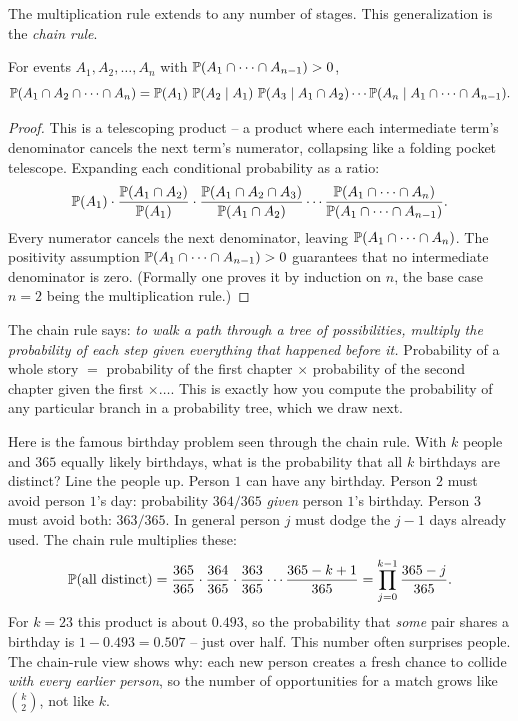 The multiplication rule extends to any number of stages. This generalization is the \emph{chain rule}.

\begin{theorem}
\label{ch04:chain-rule}
For events $A_1, A_2, \dots, A_n$ with $\P(A_1 \cap \cdots \cap A_{n-1}) > 0$,
\[
\P(A_1 \cap A_2 \cap \cdots \cap A_n)
= \P(A_1)\,\P(A_2 \given A_1)\,\P(A_3 \given A_1 \cap A_2)\cdots
\P(A_n \given A_1 \cap \cdots \cap A_{n-1}).
\]
\end{theorem}

\begin{proof}
This is a telescoping product -- a product where each intermediate term's denominator cancels the next term's numerator, collapsing like a folding pocket telescope. Expanding each conditional probability as a ratio:
\[
\P(A_1)\cdot\frac{\P(A_1\cap A_2)}{\P(A_1)}\cdot\frac{\P(A_1\cap A_2 \cap A_3)}{\P(A_1\cap A_2)}\cdots
\frac{\P(A_1\cap \cdots \cap A_n)}{\P(A_1\cap \cdots \cap A_{n-1})}.
\]
Every numerator cancels the next denominator, leaving $\P(A_1 \cap \cdots \cap A_n)$. The positivity assumption $\P(A_1\cap\cdots\cap A_{n-1}) > 0$ guarantees that no intermediate denominator is zero. (Formally one proves it by induction on $n$, the base case $n=2$ being the multiplication rule.)
\end{proof}

\begin{intuitionbox}
The chain rule says: \emph{to walk a path through a tree of possibilities, multiply the probability of each step given everything that happened before it.} Probability of a whole story $=$ probability of the first chapter $\times$ probability of the second chapter given the first $\times \dots$. This is exactly how you compute the probability of any particular branch in a probability tree, which we draw next.
\end{intuitionbox}

\begin{example}
\label{ch04:ex-birthday-chain}
Here is the famous birthday problem seen through the chain rule. With $k$ people and $365$ equally likely birthdays, what is the probability that all $k$ birthdays are distinct? Line the people up. Person $1$ can have any birthday. Person $2$ must avoid person $1$'s day: probability $364/365$ \emph{given} person $1$'s birthday. Person $3$ must avoid both: $363/365$. In general person $j$ must dodge the $j-1$ days already used. The chain rule multiplies these:
\[
\P(\text{all distinct}) = \frac{365}{365}\cdot\frac{364}{365}\cdot\frac{363}{365}\cdots\frac{365-k+1}{365}
= \prod_{j=0}^{k-1}\frac{365-j}{365}.
\]
For $k = 23$ this product is about $0.493$, so the probability that \emph{some} pair shares a birthday is $1 - 0.493 = 0.507$ -- just over half. This number often surprises people. The chain-rule view shows why: each new person creates a fresh chance to collide \emph{with every earlier person}, so the number of opportunities for a match grows like $\binom{k}{2}$, not like $k$.
\end{example}

